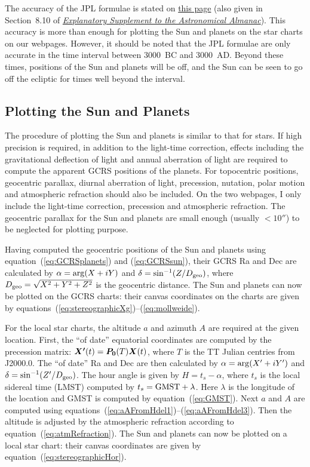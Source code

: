 \documentclass[12pt]{article}
\newcommand{\ve}[1]{\mbox{\boldmath $#1$}}
\newcommand{\expl}{\href{http://www.uscibooks.com/urban.htm}{\it Explanatory Supplement to the Astronomical Almanac}}
\begin{document}
The accuracy of the JPL formulae is stated on 
\href{https://ssd.jpl.nasa.gov/?planet_pos}{this page} (also given in Section~8.10 
of \expl). This accuracy is more than enough for plotting the Sun and planets 
on the star charts 
on our webpages. However, it should be noted that 
the JPL formulae are only accurate in the time interval between 3000~BC and 
3000~AD. Beyond these times, positions of the Sun and planets will be off, and 
the Sun can be seen to go off the ecliptic for times well beyond the interval.

\subsection{Plotting the Sun and Planets}

The procedure of plotting the Sun and planets is similar to that for 
stars. If high precision is required, in addition to the light-time correction,
effects including the gravitational deflection of light 
and annual aberration of light are required to compute the apparent GCRS 
positions of the planets. For topocentric positions, geocentric parallax, 
diurnal aberration of light, precession, nutation, polar motion and 
atmospheric refraction should also be included. On the two webpages, I only include 
the light-time correction, precession and atmospheric refraction. The geocentric 
parallax for the Sun and planets are small enough (usually $< 10''$) to be 
neglected for plotting purpose.

Having computed the geocentric positions of the Sun and planets using 
equation~(\ref{eq:GCRSplanets}) and (\ref{eq:GCRSsun}), their GCRS Ra and 
Dec are calculated by $\alpha={\rm arg}(X+iY)$ and $\delta=\sin^{-1}(Z/D_{\rm geo})$, 
where $D_{\rm geo}=\sqrt{X^2+Y^2+Z^2}$ is the geocentric distance. The Sun 
and planets can now be plotted on the GCRS charts: their canvas coordinates on the
charts are given by equations~(\ref{eq:stereographicXg})--(\ref{eq:mollweide}). 

For the local star charts, the altitude $a$
and azimuth $A$ are required at the given location. First, the ``of date'' equatorial
coordinates are computed by the precession matrix: $\ve{X'}(t)=\ve{P_0}(T)\ve{X}(t)$,
where $T$ is the TT Julian centries from J2000.0. The ``of date'' Ra and Dec
are then calculated by $\alpha = {\rm arg}(X'+iY')$ and $\delta=\sin^{-1} (Z'/D_{\rm geo})$.
The hour angle is given by $H=t_s-\alpha$, where $t_s$ is the local
sidereal time (LMST) computed by $t_s = {\rm GMST}+\lambda$.
Here $\lambda$ is the longitude of the location and GMST is computed
by equation~(\ref{eq:GMST}). Next $a$ and $A$ are computed using
equations~(\ref{eq:aAFromHdel1})--(\ref{eq:aAFromHdel3}). Then the altitude
is adjusted by the atmospheric refraction according to equation~(\ref{eq:atmRefraction}).
The Sun and planets can now be plotted on a local star chart: their canvas coordinates are
given by equation~(\ref{eq:stereographicHor}).
\end{document}
